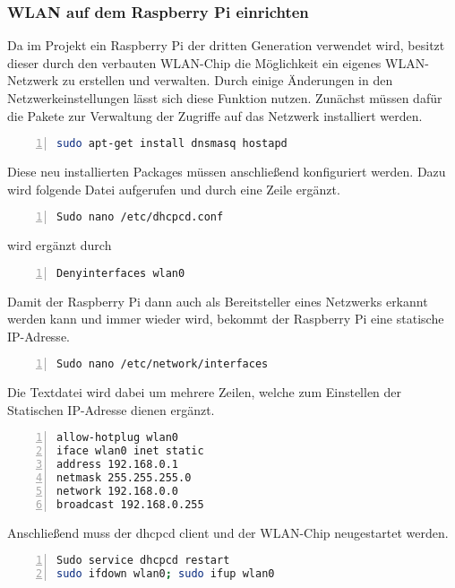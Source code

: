 \subsubsection{\ac{WLAN} auf dem Raspberry Pi einrichten}
Da im Projekt ein Raspberry Pi der dritten Generation verwendet wird, besitzt dieser durch den verbauten \ac{WLAN}-Chip die Möglichkeit ein eigenes \ac{WLAN}-Netzwerk zu erstellen und verwalten.\cite{raspi}
Durch einige Änderungen in den Netzwerkeinstellungen lässt sich diese Funktion nutzen.
Zunächst müssen dafür die Pakete zur Verwaltung der Zugriffe auf das Netzwerk installiert werden.
\begin{lstlisting}[caption={Installation dnsmasq hostapd}, language={bash}, numbers=left]
sudo apt-get install dnsmasq hostapd
\end{lstlisting}
Diese neu installierten Packages müssen anschließend konfiguriert werden. Dazu wird folgende Datei aufgerufen und durch eine Zeile ergänzt.
\begin{lstlisting}[caption={Konfiguration DHCP Server Schritt 1}, language={bash}, numbers=left]
Sudo nano /etc/dhcpcd.conf
\end{lstlisting}
wird ergänzt durch
\begin{lstlisting}[caption={Konfiguration DHCP Server Schritt 2}, language={bash}, numbers=left]
Denyinterfaces wlan0
\end{lstlisting}
Damit der Raspberry Pi dann auch als Bereitsteller eines Netzwerks erkannt werden kann und immer wieder wird, bekommt der Raspberry Pi eine statische \ac{IP}-Adresse. 
\begin{lstlisting}[caption={Konfiguration Interfaces Schritt 1}, language={bash}, numbers=left]
Sudo nano /etc/network/interfaces
\end{lstlisting}
Die Textdatei wird dabei um mehrere Zeilen, welche zum Einstellen der Statischen \ac{IP}-Adresse dienen ergänzt.
\newpage
\begin{lstlisting}[caption={Konfiguration Interfaces Schritt 2}, language={bash}, numbers=left]
allow-hotplug wlan0
iface wlan0 inet static
address 192.168.0.1
netmask 255.255.255.0
network 192.168.0.0
broadcast 192.168.0.255
\end{lstlisting}
Anschließend muss der dhcpcd client und der \ac{WLAN}-Chip neugestartet werden.
\begin{lstlisting}[caption={Konfiguration Interfaces Schritt 3}, language={bash}, numbers=left] 
Sudo service dhcpcd restart
sudo ifdown wlan0; sudo ifup wlan0
\end{lstlisting}
